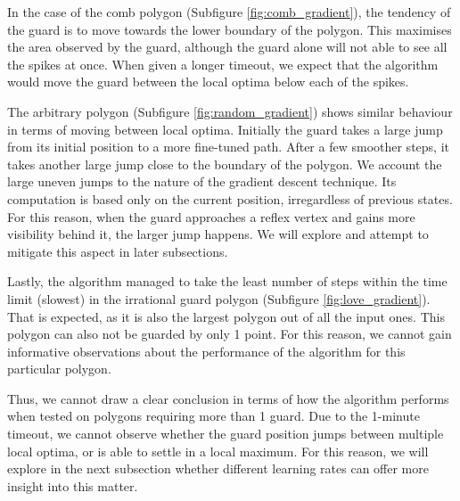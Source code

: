 In the case of the comb polygon (Subfigure \ref{fig:comb_gradient}), the tendency of the guard is to move towards the lower boundary of the polygon. This maximises the area observed by the guard, although the guard alone will not able to see all the spikes at once. 
When given a longer timeout, we expect that the algorithm would move the guard between the local optima below each of the spikes. 

The arbitrary polygon (Subfigure \ref{fig:random_gradient}) shows similar behaviour in terms of moving between local optima. Initially the guard takes a large jump from its initial position to a more fine-tuned path. After a few smoother steps, it takes another large jump close to the boundary of the polygon. We account the large uneven jumps to the nature of the gradient descent technique. Its computation is based only on the current position, irregardless of previous states. For this reason, when the guard approaches a reflex vertex and gains more visibility behind it, the larger jump happens. We will explore and attempt to mitigate this aspect in later subsections.

Lastly, the algorithm managed to take the least number of steps within the time limit (slowest) in the irrational guard polygon (Subfigure \ref{fig:love_gradient}). That is expected, as it is also the largest polygon out of all the input ones. This polygon can also not be guarded by only 1 point. For this reason, we cannot gain informative observations about the performance of the algorithm for this particular polygon.

Thus, we cannot draw a clear conclusion in terms of how the algorithm performs when tested on polygons requiring more than 1 guard. Due to the 1-minute timeout, we cannot observe whether the guard position jumps between multiple local optima, or is able to settle in a local maximum. For this reason, we will explore in the next subsection whether different learning rates can offer more insight into this matter.


